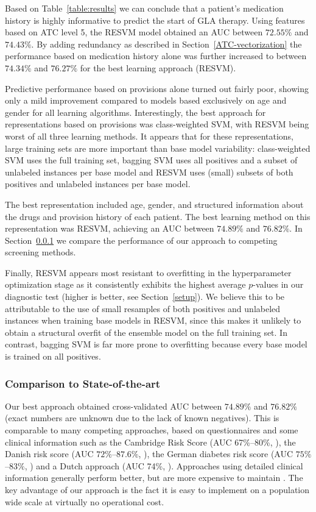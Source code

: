 Based on Table~\ref{table:results} we can conclude that a patient's medication history is highly informative to predict the start of GLA therapy. Using features based on ATC level 5, the RESVM model obtained an AUC between $72.55\%$ and $74.43\%$. By adding redundancy as described in Section~\ref{ATC-vectorization} the performance based on medication history alone was further increased to between $74.34\%$ and $76.27\%$ for the best learning approach (RESVM).

Predictive performance based on provisions alone turned out fairly poor, showing only a mild improvement compared to models based exclusively on age and gender for all learning algorithms. Interestingly, the best approach for representations based on provisions was class-weighted SVM, with RESVM being worst of all three learning methods. It appears that for these representations, large training sets are more important than base model variability: class-weighted SVM uses the full training set, bagging SVM uses all positives and a subset of unlabeled instances per base model and RESVM uses (small) subsets of both positives and unlabeled instances per base model.

The best representation included age, gender, and structured information about the drugs and provision history of each patient. The best learning method on this representation was RESVM, achieving an AUC between $74.89\%$ and $76.82\%$. In Section~\ref{stateoftheart} we compare the performance of our approach to competing screening methods.

Finally, RESVM appears most resistant to overfitting in the hyperparameter optimization stage as it consistently exhibits the highest average $p$-values in our diagnostic test (higher is better, see Section~\ref{setup}). We believe this to be attributable to the use of small resamples of both positives and unlabeled instances when training base models in RESVM, since this makes it unlikely to obtain a structural overfit of the ensemble model on the full training set. In contrast, bagging SVM is far more prone to overfitting because every base model is trained on all positives.

\subsubsection{Comparison to State-of-the-art} \label{stateoftheart}
Our best approach obtained cross-validated AUC between $74.89\%$ and $76.82\%$ (exact numbers are unknown due to the lack of known negatives). This is comparable to many competing approaches, based on questionnaires and some clinical information such as the Cambridge Risk Score (AUC 67\%--80\%, \citep{spijkerman2004performance, griffin2000diabetes}), the Danish risk score (AUC $72\%$--$87.6\%$, \citep{glumer2004danish}), the German diabetes risk score (AUC $75\%$--$83\%$, \citep{schulze2007accurate}) and a Dutch approach (AUC 74\%, \citep{baan1999performance}). Approaches using detailed clinical information generally perform better, but are more expensive to maintain \citep{stern2002identification, mcneely2003comparison, lindstrom2003diabetes, heikes2008diabetes}. The key advantage of our approach is the fact it is easy to implement on a population wide scale at virtually no operational cost.

